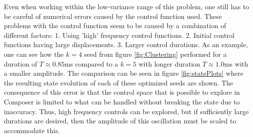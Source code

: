 \documentclass[aps,pra,reprint,superscriptaddress]{revtex4-1}
\begin{document}
Even when working within the low-variance range of this problem, one still has to be careful of numerical errors caused by the control function used. These problems with the control function seem to be caused by a combination of different factors: 1. Using 'high' frequency control functions. 2. Initial control functions having large displacements. 3. Larger control durations. As an example, one can see how the $k=4$ seed from figure \ref{fig:Clustering} performed for a duration of $T\approx 0.85$ms compared to a $k=5$ with longer duration  $T\approx 1.0$ms with a smaller amplitude. The comparison can be seen in figure \ref{fig:statePlots} where the resulting state evolution of each of these optimized seeds are shown. The consequence of this error is that the control space that is possible to explore in Composer is limited to what can be handled without breaking the state due to inaccuracy. Thus, high frequency controls can be explored, but if sufficiently large durations are desired, then the amplitude of this oscillation must be scaled to accommodate this.
\end{document}
